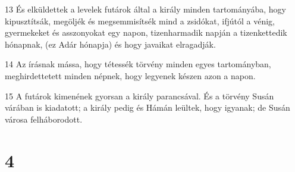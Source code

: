 \par 13 És elküldettek a levelek futárok által a király minden tartományába, hogy kipusztítsák, megöljék és megsemmisítsék mind a zsidókat, ifjútól a vénig, gyermekeket és asszonyokat egy napon, tizenharmadik napján a tizenkettedik hónapnak, (ez Adár hónapja) és hogy javaikat elragadják.
\par 14 Az írásnak mássa, hogy tétessék törvény minden egyes tartományban, meghirdettetett minden népnek, hogy legyenek készen azon a napon.
\par 15 A futárok kimenének gyorsan a király parancsával. És a törvény Susán várában is kiadatott; a király pedig és Hámán leültek, hogy igyanak; de Susán városa felháborodott.

\chapter{4}

